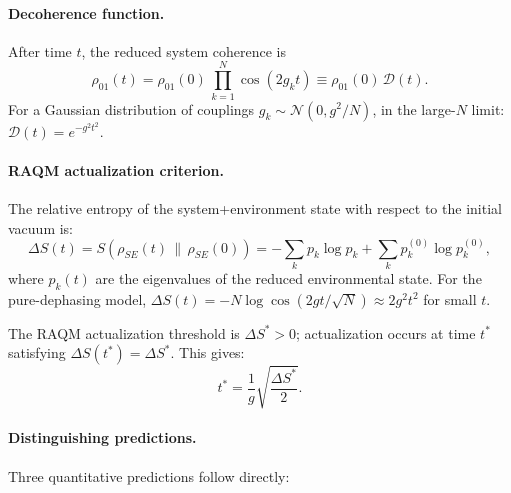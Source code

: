 \documentclass[11pt,a4paper]{article}
\theoremstyle{plain}
\theoremstyle{definition}
\theoremstyle{remark}
\begin{document}
\paragraph{Decoherence function.}
After time $t$, the reduced system coherence is
\begin{equation}
  \rho_{01}(t) = \rho_{01}(0)\,\prod_{k=1}^N
  \cos\!\left(2g_k t\right) \equiv \rho_{01}(0)\,\mathcal{D}(t).
  \label{eq:decoherence}
\end{equation}
For a Gaussian distribution of couplings $g_k \sim \mathcal{N}(0,g^2/N)$,
in the large-$N$ limit: $\mathcal{D}(t) = e^{-g^2 t^2}$.

\paragraph{RAQM actualization criterion.}
The relative entropy of the system+environment state with respect to
the initial vacuum is:
\begin{equation}
  \Delta S(t) = S\!\left(\rho_{SE}(t)\,\big\|\,\rho_{SE}(0)\right)
  = -\sum_{k} p_k \log p_k + \sum_k p_k^{(0)}\log p_k^{(0)},
\end{equation}
where $p_k(t)$ are the eigenvalues of the reduced environmental state.
For the pure-dephasing model, $\Delta S(t) = -N\log\cos(2gt/\sqrt{N})
\approx 2g^2 t^2$ for small $t$.

The RAQM actualization threshold is $\Delta S^* > 0$; actualization
occurs at time $t^*$ satisfying $\Delta S(t^*) = \Delta S^*$.
This gives:
\begin{equation}
  t^* = \frac{1}{g}\sqrt{\frac{\Delta S^*}{2}}.
  \label{eq:tstar}
\end{equation}

\paragraph{Distinguishing predictions.}
Three quantitative predictions follow directly:
\end{document}
